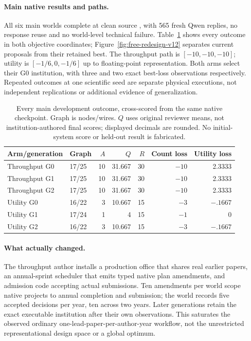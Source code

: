 \paragraph{Main native results and paths.}
All six main worlds complete at clean source , with 565 fresh
Qwen replies, no response reuse and no world-level technical failure.
Table~\ref{tab:free-redesign-v12} shows every outcome in both objective
coordinates; Figure~\ref{fig:free-redesign-v12} separates current proposals
from their retained best. The throughput path is $[-10,-10,-10]$; utility is
$[-1/6,0,-1/6]$ up to floating-point representation. Both arms select their G0
institution, with three and two exact best-loss observations respectively.
Repeated outcomes at one scientific seed are separate physical executions,
not independent replications or additional evidence of generalization.

\begin{table}[t]
\centering\small
\caption{Every main development outcome, cross-scored from the same native
checkpoint. Graph is nodes/wires. $Q$ uses original reviewer means, not
institution-authored final scores; displayed decimals are rounded.
No initial-system score or held-out result is fabricated.}
\label{tab:free-redesign-v12}
\begin{tabular}{llrrrrr}
\toprule
Arm/generation & Graph & $A$ & $Q$ & $R$ & Count loss & Utility loss \\
\midrule
Throughput G0 & 17/25 & 10 & 31.667 & 30 & $-10$ & 2.3333 \\
Throughput G1 & 17/25 & 10 & 31.667 & 30 & $-10$ & 2.3333 \\
Throughput G2 & 17/25 & 10 & 31.667 & 30 & $-10$ & 2.3333 \\
\addlinespace[3pt]
Utility G0 & 16/22 & 3 & 10.667 & 15 & $-3$ & $-.1667$ \\
Utility G1 & 17/24 & 1 & 4 & 15 & $-1$ & 0 \\
Utility G2 & 16/22 & 3 & 10.667 & 15 & $-3$ & $-.1667$ \\
\bottomrule
\end{tabular}
\end{table}

\paragraph{What actually changed.}
The throughput author installs a production office that shares real earlier
papers, an annual-sprint scheduler that emits typed native plan amendments,
and admission code accepting actual submissions. Ten amendments per world
scope native projects to annual completion and submission; the world records
five accepted decisions per year, ten across two years. Later generations
retain the exact executable institution after their own observations.
This saturates the observed ordinary one-lead-paper-per-author-year workflow,
not the unrestricted representational design space or a global optimum.

